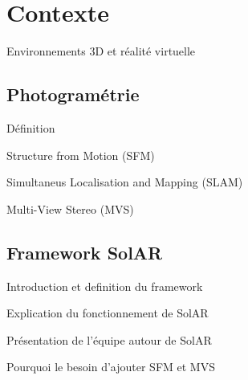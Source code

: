 \chapter{Contexte}

\par
Environnements 3D et réalité virtuelle

\section{Photogramétrie}

\par
Définition

\par
Structure from Motion (SFM)

\par
Simultaneus Localisation and Mapping (SLAM)

\par
Multi-View Stereo (MVS)

\section{Framework SolAR}

Introduction et definition du framework


Explication du fonctionnement de SolAR

Présentation de l'équipe autour de SolAR

Pourquoi le besoin d'ajouter SFM et MVS

